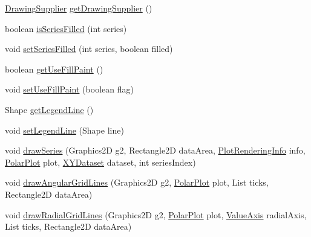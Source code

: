 \begin{DoxyCompactItemize}
\item 
\mbox{\hyperlink{interfaceorg_1_1jfree_1_1chart_1_1plot_1_1_drawing_supplier}{Drawing\+Supplier}} \mbox{\hyperlink{classorg_1_1jfree_1_1chart_1_1renderer_1_1_default_polar_item_renderer_ababd4dcc1e01e648a4bf9a3ffe875f27}{get\+Drawing\+Supplier}} ()
\item 
boolean \mbox{\hyperlink{classorg_1_1jfree_1_1chart_1_1renderer_1_1_default_polar_item_renderer_af0195e7c164a283bb10399c454cea1bb}{is\+Series\+Filled}} (int series)
\item 
void \mbox{\hyperlink{classorg_1_1jfree_1_1chart_1_1renderer_1_1_default_polar_item_renderer_a9bc668284f645601f433cac0b8baa4c8}{set\+Series\+Filled}} (int series, boolean filled)
\item 
boolean \mbox{\hyperlink{classorg_1_1jfree_1_1chart_1_1renderer_1_1_default_polar_item_renderer_a7112620182765d93886d482a94cf2b48}{get\+Use\+Fill\+Paint}} ()
\item 
void \mbox{\hyperlink{classorg_1_1jfree_1_1chart_1_1renderer_1_1_default_polar_item_renderer_a06d38abcaf202f22bf90deae6d93d3bb}{set\+Use\+Fill\+Paint}} (boolean flag)
\item 
Shape \mbox{\hyperlink{classorg_1_1jfree_1_1chart_1_1renderer_1_1_default_polar_item_renderer_a5b323bb3c4df0c784bbffa591b3d8d99}{get\+Legend\+Line}} ()
\item 
void \mbox{\hyperlink{classorg_1_1jfree_1_1chart_1_1renderer_1_1_default_polar_item_renderer_ac2ba04156bf456553d124b59febe8919}{set\+Legend\+Line}} (Shape line)
\item 
void \mbox{\hyperlink{classorg_1_1jfree_1_1chart_1_1renderer_1_1_default_polar_item_renderer_a175674973fea05095e787c0d5b4eb06a}{draw\+Series}} (Graphics2D g2, Rectangle2D data\+Area, \mbox{\hyperlink{classorg_1_1jfree_1_1chart_1_1plot_1_1_plot_rendering_info}{Plot\+Rendering\+Info}} info, \mbox{\hyperlink{classorg_1_1jfree_1_1chart_1_1plot_1_1_polar_plot}{Polar\+Plot}} plot, \mbox{\hyperlink{interfaceorg_1_1jfree_1_1data_1_1xy_1_1_x_y_dataset}{X\+Y\+Dataset}} dataset, int series\+Index)
\item 
void \mbox{\hyperlink{classorg_1_1jfree_1_1chart_1_1renderer_1_1_default_polar_item_renderer_a5439ece62914fdbfbc77c1138cbbda92}{draw\+Angular\+Grid\+Lines}} (Graphics2D g2, \mbox{\hyperlink{classorg_1_1jfree_1_1chart_1_1plot_1_1_polar_plot}{Polar\+Plot}} plot, List ticks, Rectangle2D data\+Area)
\item 
void \mbox{\hyperlink{classorg_1_1jfree_1_1chart_1_1renderer_1_1_default_polar_item_renderer_a47b1c314c9da7a50b3271f8bb0c4eb1d}{draw\+Radial\+Grid\+Lines}} (Graphics2D g2, \mbox{\hyperlink{classorg_1_1jfree_1_1chart_1_1plot_1_1_polar_plot}{Polar\+Plot}} plot, \mbox{\hyperlink{classorg_1_1jfree_1_1chart_1_1axis_1_1_value_axis}{Value\+Axis}} radial\+Axis, List ticks, Rectangle2D data\+Area)

\end{DoxyCompactItemize}
